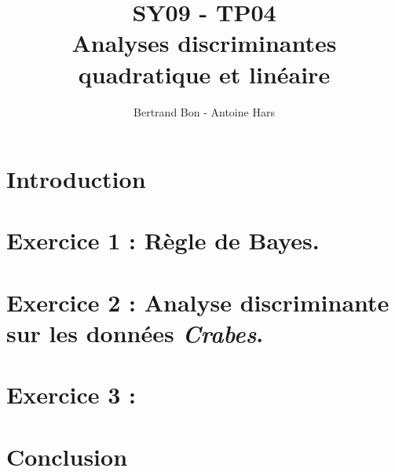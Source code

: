 \documentclass[a4paper, 10pt]{article}
\title{SY09 - TP04\\Analyses discriminantes quadratique et linéaire}
\author{Bertrand Bon - Antoine Hars}
\begin{document}
\maketitle

\section*{Introduction}


\section*{Exercice 1 : Règle de Bayes.}

\subsection*{}

\subsection*{}

\section*{Exercice 2 : Analyse discriminante sur les données \textit{Crabes}.}

\subsection*{}
\subsection*{}
\subsection*{}
\subsection*{}

\section*{Exercice 3 : }

\subsection*{}
\subsection*{}
\subsection*{}

\section*{Conclusion}
\end{document}
